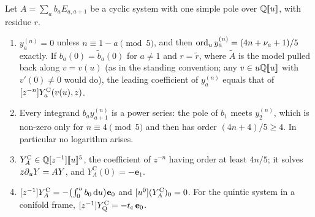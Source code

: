 \begin{lem}
\label{lem:gau-vanq}
Let $A=\sum_ab_aE_{a,a+1}$ be a cyclic system with one simple pole over $\mathbb{Q}[\![ u ]\!]$, with residue $r$.
\begin{enumerate}
\item[(a)] $y^{(n)}_a=0$ unless $n\equiv1-a\pmod5$, and then $\operatorname{ord}_uy^{(n)}_a=(4n+\nu_a+1)/5$ exactly. If $b_a(0)=\tilde b_a(0)$ for $a\neq1$ and $r=\tilde r$, where $\tilde A$ is the model pulled back along $v=v(u)$ (as in the standing convention; any $v\in u\mathbb{Q}[\![ u ]\!]$ with $v'(0)\neq0$ would do), the leading coefficient of $y^{(n)}_a$ equals that of $[z^{-n}]Y^{\mathrm{C}}_a(v(u),z)$.
\item[(b)] Every integrand $b_ay^{(n)}_{a+1}$ is a power series: the pole of $b_1$ meets $y^{(n)}_2$, which is non-zero only for $n\equiv4\pmod5$ and then has order $(4n+4)/5\geq4$. In particular no logarithm arises.
\item[(c)] $Y^{\mathrm C}_A\in\mathbb{Q}[z^{-1}][\![ u ]\!]^5$, the coefficient of $z^{-n}$ having order at least $4n/5$; it solves $z\partial_uY=AY$, and $Y^{\mathrm C}_A(0)=-\mathbf e_1$.
\item[(d)] $[z^{-1}]Y^{\mathrm C}_A=-\bigl(\int_0^ub_0\,\mathrm{d} u\bigr)\mathbf e_0$ and $[u^0](Y^{\mathrm C}_A)_0=0$. For the quintic system in a conifold frame, $[z^{-1}]Y^{\mathrm{C}}_{\mathrm{Q}}=-t_{\mathrm{c}}\,\mathbf e_0$.
\end{enumerate}
\end{lem}

